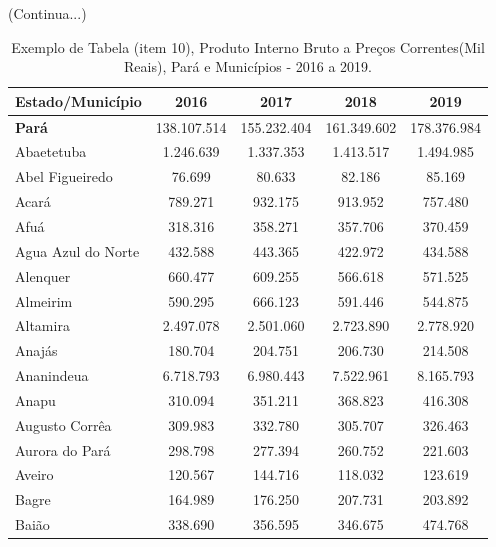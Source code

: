\newpage
\begin{table}[!htb]
    \centering
    {
    \caption{Exemplo de Tabela (item 10), Produto Interno Bruto a Preços Correntes(Mil Reais), Pará e Municípios - 2016 a 2019.}  (Continua...)
    \label{item 10 regras1}
    \vspace{0.1cm}
\begin{tabular}{l|c|c|c|c}
  \hline\hline
  Estado/Município        &     2016    &      2017   &    2018     &     2019     \\
  \hline\hline
   \textbf{Pará}          & 138.107.514 & 155.232.404 & 161.349.602 & 178.376.984  \\
   Abaetetuba             & 1.246.639   & 1.337.353   & 1.413.517   & 1.494.985    \\
   Abel Figueiredo        &   76.699    &   80.633    &   82.186    &   85.169     \\
   Acará                  &   789.271   &   932.175   &  913.952    & 757.480      \\
   Afuá                   &   318.316   &  358.271    &  357.706    &  370.459     \\ 
   Agua Azul do Norte     &  432.588    &   443.365   &  422.972    &  434.588     \\
   Alenquer               &   660.477   &   609.255   &  566.618    &  571.525     \\
   Almeirim               &  590.295    &   666.123   &  591.446    &  544.875     \\
   Altamira               &  2.497.078  &  2.501.060  &  2.723.890  &  2.778.920   \\
   Anajás                 &  180.704    &  204.751    &  206.730    &  214.508     \\
   Ananindeua             &  6.718.793  &  6.980.443  &  7.522.961  &  8.165.793   \\
   Anapu                  &  310.094    &  351.211    &  368.823    &  416.308     \\
   Augusto Corrêa         & 309.983     &  332.780    &  305.707    &  326.463     \\
   Aurora do Pará         &  298.798    &  277.394    &  260.752    &  221.603      \\
   Aveiro                 &  120.567    &  144.716    &  118.032    &  123.619      \\
   Bagre                  &  164.989    &  176.250    &  207.731    &  203.892      \\
   Baião                  &  338.690    &  356.595    &  346.675    &  474.768      \\

\end{tabular}}
\end{table}
